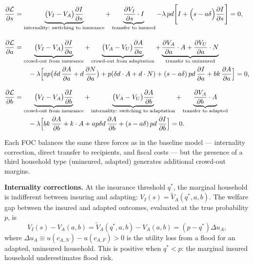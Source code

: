 \documentclass{article}
\begin{document}
\begin{align}
\frac{\partial\mathcal{L}}{\partial s}
&=
\underbrace{\bigl(V_I - V_A\bigr)\frac{\partial I}{\partial s}}_{\text{internality: switching to insurance}}
+\underbrace{\frac{\partial V_I}{\partial s}\cdot I}_{\text{transfer to insured}}
-\lambda\,pd\Biggl[I + \Bigl(s - a\delta\Bigr)\frac{\partial I}{\partial s}\Biggr]
= 0, \label{eq:foc_s_discrete}
\\[10pt]
\frac{\partial\mathcal{L}}{\partial a}
&=
\underbrace{\bigl(V_I - V_A\bigr)\frac{\partial I}{\partial a}}_{\text{crowd-out from insurance}}
+\underbrace{\bigl(V_A - V_U\bigr)\frac{\partial A}{\partial a}}_{\text{crowd-out from adaptation}}
+\underbrace{\frac{\partial V_A}{\partial a}\cdot A + \frac{\partial V_U}{\partial a}\cdot N}_{\text{transfer to uninsured}}
\notag\\
&\qquad
-\lambda\Bigl[ap\bigl(\delta d\,\frac{\partial A}{\partial a} + d\,\frac{\partial N}{\partial a}\bigr)
+ p(\delta d\cdot A + d\cdot N)
+ (s-a\delta)\,pd\,\frac{\partial I}{\partial a}
+ bk\,\frac{\partial A}{\partial a}
\Bigr]
= 0, \label{eq:foc_a_discrete}
\\[10pt]
\frac{\partial\mathcal{L}}{\partial b}
&=
\underbrace{\bigl(V_I - V_A\bigr)\frac{\partial I}{\partial b}}_{\text{crowd-out from insurance}}
+\underbrace{\bigl(V_A - V_U\bigr)\frac{\partial A}{\partial b}}_{\text{internality: switching to adaptation}}
+\underbrace{\frac{\partial V_A}{\partial b}\cdot A}_{\text{transfer to adapted}}
\notag\\
&\qquad
-\lambda\Bigl[bk\,\frac{\partial A}{\partial b} + k\cdot A
+ ap\delta d\,\frac{\partial A}{\partial b}
+ (s-a\delta)\,pd\,\frac{\partial I}{\partial b}
\Bigr]
= 0. \label{eq:foc_b_discrete}
\end{align}

Each FOC balances the same three forces as in the baseline model --- internality correction, direct transfer to recipients, and fiscal costs --- but the presence of a third household type (uninsured, adapted) generates additional crowd-out margins.

\textbf{Internality corrections.} At the insurance threshold $q^*$, the marginal household is indifferent between insuring and adapting: $V_I(s) = \tilde{V}_A(q^*,a,b)$. The welfare gap between the insured and adapted outcomes, evaluated at the true probability $p$, is
\begin{equation}
    V_I(s) - V_A(a,b) = \tilde{V}_A(q^*,a,b) - V_A(a,b) = (p - q^*)\Delta u_A,
    \label{eq:internality_insurance}
\end{equation}
where $\Delta u_A \equiv u(c_{A,N}) - u(c_{A,F}) > 0$ is the utility loss from a flood for an adapted, uninsured household. This is positive when $q^* < p$: the marginal insured household underestimates flood risk.
\end{document}
